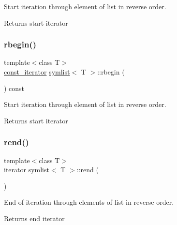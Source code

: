 Start iteration through element of list in reverse order. 

\begin{DoxyReturn}{Returns}
start iterator 
\end{DoxyReturn}
\mbox{\label{classsymlist_a3779415d5588f9621494f40789841caf}} 
\subsubsection{\texorpdfstring{rbegin()}{rbegin()}\hspace{0.1cm}{\footnotesize\ttfamily [2/2]}}
{\footnotesize\ttfamily template$<$class T$>$ \\
\mbox{\hyperlink{structsymlist__iterator}{const\+\_\+iterator}} \mbox{\hyperlink{classsymlist}{symlist}}$<$ T $>$\+::rbegin (\begin{DoxyParamCaption}{ }\end{DoxyParamCaption}) const\hspace{0.3cm}{\ttfamily [inline]}}



Start iteration through element of list in reverse order. 

\begin{DoxyReturn}{Returns}
start iterator 
\end{DoxyReturn}
\mbox{\label{classsymlist_a421fc482e62f257a9081e9e1c29d66a6}} 
\subsubsection{\texorpdfstring{rend()}{rend()}\hspace{0.1cm}{\footnotesize\ttfamily [1/2]}}
{\footnotesize\ttfamily template$<$class T$>$ \\
\mbox{\hyperlink{structsymlist__iterator}{iterator}} \mbox{\hyperlink{classsymlist}{symlist}}$<$ T $>$\+::rend (\begin{DoxyParamCaption}{ }\end{DoxyParamCaption})\hspace{0.3cm}{\ttfamily [inline]}}



End of iteration through elements of list in reverse order. 

\begin{DoxyReturn}{Returns}
end iterator 
\end{DoxyReturn}
\mbox{\label{classsymlist_a42379ebaa07ddb1160d785fec701712d}} 
